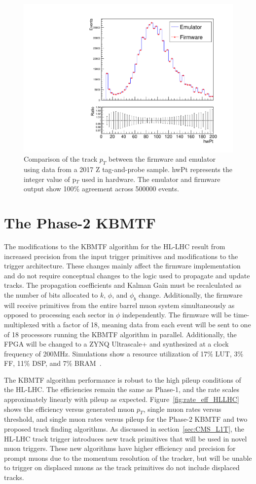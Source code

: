 \begin{figure}[htb!]
	\centering
	\includegraphics[width=0.55\linewidth]{figs/04_muons/emuVsFw_pt.pdf}
	\caption[Comparison of the track $p_T$ between the firmware and emulator using data from a 2017 Z tag-and-probe sample. hwPt represents the integer value of p$_T$ used in hardware. The emulator and firmware output show 100\% agreement across 500000 events.]{Comparison of the track $p_T$ between the firmware and emulator using data from a 2017 Z tag-and-probe sample. hwPt represents the integer value of p$_T$ used in hardware. The emulator and firmware output show 100\% agreement across 500000 events.}
	\label{fig:kmtf_fwVsEmu}
\end{figure}

\section{The Phase-2 KBMTF} \label{sec:HL_KBMTF}
The modifications to the KBMTF algorithm for the HL-LHC result from increased precision from the input trigger primitives and modifications to the trigger architecture. These changes mainly affect the firmware implementation and do not require conceptual changes to the logic used to propagate and update tracks. The propagation coefficients and Kalman Gain must be recalculated as the number of bits allocated to $k$, $\phi$, and $\phi_b$ change. Additionally, the firmware will receive primitives from the entire barrel muon system simultaneously as opposed to processing each sector in $\phi$ independently. The firmware will be time-multiplexed with a factor of 18, meaning data from each event will be sent to one of 18 processors running the KBMTF algorithm in parallel. Additionally, the FPGA will be changed to a ZYNQ Ultrascale+ and synthesized at a clock frequency of 200\unit{MHz}. Simulations show a resource utilization of 17\% LUT, 3\% FF, 11\% DSP, and 7\% BRAM~\cite{CERN-LHCC-2020-004}.

The KBMTF algorithm performance is robust to the high pileup conditions of the HL-LHC. The efficiencies remain the same as Phase-1, and the rate scales approximately linearly with pileup as expected. Figure~\ref{fig:rate_eff_HLLHC} shows the efficiency versus generated muon $p_T$, single muon rates versus threshold, and single muon rates versus pileup for the Phase-2 KBMTF and two proposed track finding algorithms. As discussed in section~\ref{sec:CMS_L1T}, the HL-LHC track trigger introduces new track primitives that will be used in novel muon triggers. These new algorithms have higher efficiency and precision for prompt muons due to the momentum resolution of the tracker, but will be unable to trigger on displaced muons as the track primitives do not include displaced tracks. 

